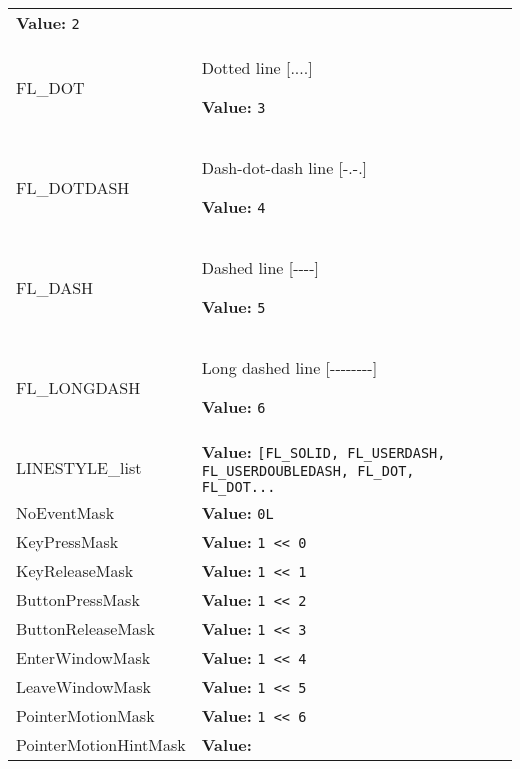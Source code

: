 \begin{longtable}{|p{\varnamewidth}|p{\vardescrwidth}|l}
\textbf{Value:} 
{\tt 2}&\\
\cline{1-2}
\raggedright F\-L\-\_\-D\-O\-T\- & \raggedright Dotted line {[}....{]}

\textbf{Value:} 
{\tt 3}&\\
\cline{1-2}
\raggedright F\-L\-\_\-D\-O\-T\-D\-A\-S\-H\- & \raggedright Dash-dot-dash line {[}-.-.{]}

\textbf{Value:} 
{\tt 4}&\\
\cline{1-2}
\raggedright F\-L\-\_\-D\-A\-S\-H\- & \raggedright Dashed line {[}-{}-{}-{}-{]}

\textbf{Value:} 
{\tt 5}&\\
\cline{1-2}
\raggedright F\-L\-\_\-L\-O\-N\-G\-D\-A\-S\-H\- & \raggedright Long dashed line {[}-{}-{}-{}-{}-{}-{}-{}-{]}

\textbf{Value:} 
{\tt 6}&\\
\cline{1-2}
\raggedright L\-I\-N\-E\-S\-T\-Y\-L\-E\-\_\-l\-i\-s\-t\- & \raggedright \textbf{Value:} 
{\tt [FL\_SOLID, FL\_USERDASH, FL\_USERDOUBLEDASH, FL\_DOT, FL\_DOT\texttt{...}}&\\
\cline{1-2}
\raggedright N\-o\-E\-v\-e\-n\-t\-M\-a\-s\-k\- & \raggedright \textbf{Value:} 
{\tt 0L}&\\
\cline{1-2}
\raggedright K\-e\-y\-P\-r\-e\-s\-s\-M\-a\-s\-k\- & \raggedright \textbf{Value:} 
{\tt 1 {\textless}{\textless} 0}&\\
\cline{1-2}
\raggedright K\-e\-y\-R\-e\-l\-e\-a\-s\-e\-M\-a\-s\-k\- & \raggedright \textbf{Value:} 
{\tt 1 {\textless}{\textless} 1}&\\
\cline{1-2}
\raggedright B\-u\-t\-t\-o\-n\-P\-r\-e\-s\-s\-M\-a\-s\-k\- & \raggedright \textbf{Value:} 
{\tt 1 {\textless}{\textless} 2}&\\
\cline{1-2}
\raggedright B\-u\-t\-t\-o\-n\-R\-e\-l\-e\-a\-s\-e\-M\-a\-s\-k\- & \raggedright \textbf{Value:} 
{\tt 1 {\textless}{\textless} 3}&\\
\cline{1-2}
\raggedright E\-n\-t\-e\-r\-W\-i\-n\-d\-o\-w\-M\-a\-s\-k\- & \raggedright \textbf{Value:} 
{\tt 1 {\textless}{\textless} 4}&\\
\cline{1-2}
\raggedright L\-e\-a\-v\-e\-W\-i\-n\-d\-o\-w\-M\-a\-s\-k\- & \raggedright \textbf{Value:} 
{\tt 1 {\textless}{\textless} 5}&\\
\cline{1-2}
\raggedright P\-o\-i\-n\-t\-e\-r\-M\-o\-t\-i\-o\-n\-M\-a\-s\-k\- & \raggedright \textbf{Value:} 
{\tt 1 {\textless}{\textless} 6}&\\
\cline{1-2}
\raggedright P\-o\-i\-n\-t\-e\-r\-M\-o\-t\-i\-o\-n\-H\-i\-n\-t\-M\-a\-s\-k\- & \raggedright \textbf{Value:} 

\end{longtable}
